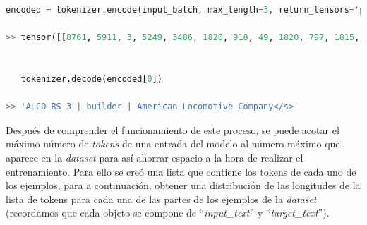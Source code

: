 \begin{lstlisting}[language=Python, caption=Tokenizador con parámetros utilizados, label={lst:t5tokenizerMaxLength1024}]
   encoded = tokenizer.encode(input_batch, max_length=3, return_tensors='pt', truncation=True)
    
>> tensor([[8761, 5911, 3, 5249, 3486, 1820, 918, 49, 1820, 797, 1815, 287, 32, 3268, 1958, 1]])


   tokenizer.decode(encoded[0])
   
>> 'ALCO RS-3 | builder | American Locomotive Company</s>'
\end{lstlisting} 


Después de comprender el funcionamiento de este proceso, se puede acotar el máximo número de \textit{tokens} de una entrada del modelo al número máximo que aparece en la \textit{dataset} para así ahorrar espacio a la hora de realizar el entrenamiento. Para ello se creó una lista que contiene los tokens de cada uno de los ejemplos, para a continuación, obtener una distribución de las longitudes de la lista de tokens para cada una de las partes de los ejemplos de la \textit{dataset} (recordamos que cada objeto se compone de ``\textit{input\_text}'' y ``\textit{target\_text}''). 

